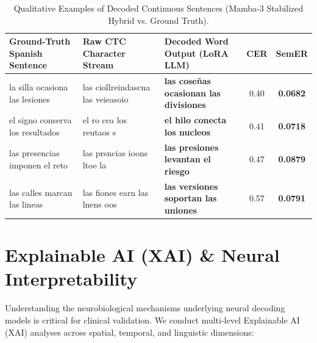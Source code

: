 \documentclass[conference]{IEEEtran}
\begin{document}
\begin{table}[t]
\centering
\caption{Qualitative Examples of Decoded Continuous Sentences (Mamba-3 Stabilized Hybrid vs. Ground Truth).}
\label{tab:qualitative_samples}
\begin{tabular}{@{}p{4.2cm}p{4.5cm}p{5.0cm}cc@{}}
\toprule
\textbf{Ground-Truth Spanish Sentence} & \textbf{Raw CTC Character Stream} & \textbf{Decoded Word Output (LoRA LLM)} & \textbf{CER} & \textbf{SemER} \\
\midrule
la silla ocasiona las lesiones & las ciollreindascna las veieasoio & \textbf{las cose\~nas ocasionan las divisiones} & 0.40 & \textbf{0.0682} \\
el signo conserva los resultados & el ro cea los reutaos s & \textbf{el hilo conecta los nucleos} & 0.41 & \textbf{0.0718} \\
las presencias imponen el reto & las prsncias ioons ltoe la & \textbf{las presiones levantan el riesgo} & 0.47 & \textbf{0.0879} \\
las calles marcan las lineas & las fiones earn las lnens oos & \textbf{las versiones soportan las uniones} & 0.57 & \textbf{0.0791} \\
\bottomrule
\end{tabular}
\end{table}

\section{Explainable AI (XAI) \& Neural Interpretability}
\label{sec:xai}

Understanding the neurobiological mechanisms underlying neural decoding models is critical for clinical validation. We conduct multi-level Explainable AI (XAI) analyses across spatial, temporal, and linguistic dimensions:
\end{document}
